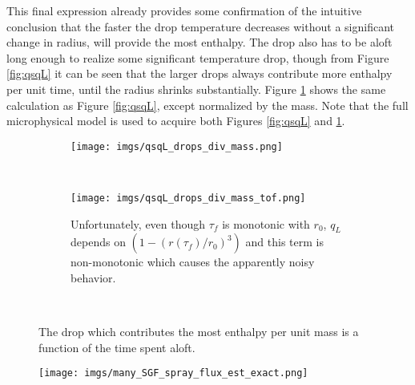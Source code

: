 \documentclass[10pt,a4paper]{article}
\begin{document}
This final expression already provides some confirmation of the intuitive conclusion that the faster the drop temperature decreases without a significant change in radius, will provide the most enthalpy. The drop also has to be aloft long enough to realize some significant temperature drop, though from Figure \ref{fig:qsqL} it can be seen that the larger drops always contribute more enthalpy per unit time, until the radius shrinks substantially. Figure \ref{fig:qsqL_div_mass} shows the same calculation as Figure \ref{fig:qsqL}, except normalized by the mass. Note that the full microphysical model is used to acquire both Figures \ref{fig:qsqL} and \ref{fig:qsqL_div_mass}.
\begin{figure}[h!]
    \centering
    \begin{subfigure}[t!]{0.65\textwidth}
        \texttt{[image: imgs/qsqL\_drops\_div\_mass.png]}        
    \end{subfigure}
    ~ %
    \begin{subfigure}[t!]{0.65\textwidth}
        \texttt{[image: imgs/qsqL\_drops\_div\_mass\_tof.png]}   
        \caption{Unfortunately, even though $\tau_f$ is monotonic with $r_0$, $q_L$ depends on $(1-(r(\tau_f)/r_0)^3)$ and this term is non-monotonic which causes the apparently noisy behavior. }     
    \end{subfigure}
    ~ %
       \caption{The drop which contributes the most enthalpy per unit mass is a function of the time spent aloft. \label{fig:qsqL_div_mass}}
\end{figure}

 
 \begin{figure}[h!]
    \centering
        \texttt{[image: imgs/many\_SGF\_spray\_flux\_est\_exact.png]}        
       \caption{ \label{fig:many_SGF_spray_flux_est_exact}}
\end{figure}
 
 
\newpage



 
 
\end{document}
